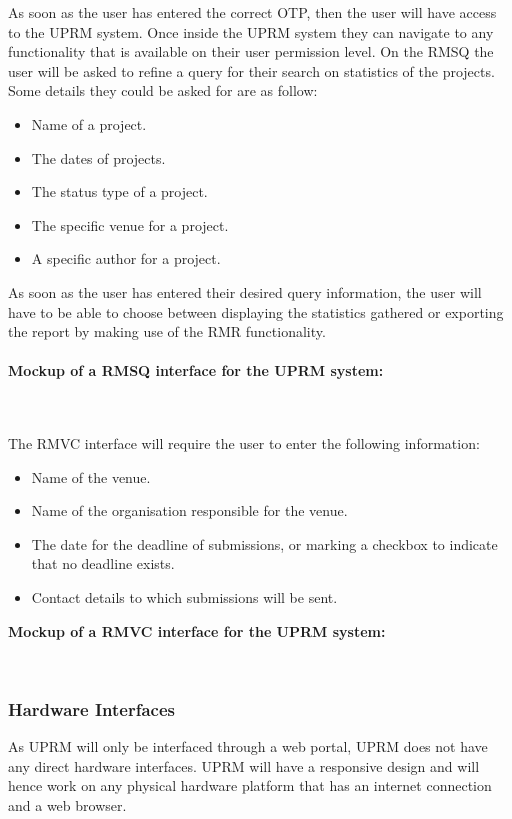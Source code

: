 	As soon as the user has entered the correct OTP, then the user will have access to the UPRM system. Once inside the UPRM system they can navigate to any functionality that is available on their user permission level. On the RMSQ the user will be asked to refine a query for their search on statistics of the projects.\\ Some details they could be asked for are as follow:
	\begin{itemize}
		\item Name of a project.
		\item The dates of projects.
		\item The status type of a project.
		\item The specific venue for a project.
		\item A specific author for a project.
	\end{itemize}
	As soon as the user has entered their desired query information, the user will have to be able to choose between displaying the statistics gathered or exporting the report by making use of the RMR functionality.\\ \\
	\textbf{Mockup of a RMSQ interface for the UPRM system: }\\
	\centerline{}\\ \\
	The RMVC interface will require the user to enter the following information:
	\begin{itemize}
		\item Name of the venue.
		\item Name of the organisation responsible for the venue.
		\item The date for the deadline of submissions, or marking a checkbox to indicate that no deadline exists.
		\item Contact details to which submissions will be sent.
	\end{itemize}
	\pagebreak
	\textbf{Mockup of a RMVC interface for the UPRM system: }\\
	\centerline{}\\
	
	
\subsubsection{Hardware Interfaces}
	As UPRM will only be interfaced through a web portal, UPRM does not have any direct hardware interfaces. UPRM will have a responsive design and will hence work on any physical hardware platform that has an internet connection and a web browser.
	
